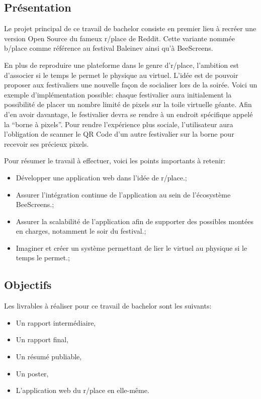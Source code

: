 \subsection{Présentation}

Le projet principal de ce travail de bachelor consiste en premier lieu à recréer une version Open Source du fameux r/place de Reddit. Cette variante nommée b/place comme référence au festival Baleinev ainsi qu'à BeeScreens.

En plus de reproduire une plateforme dans le genre d'r/place, l'ambition est d'associer si le temps le permet le physique au virtuel. L'idée est de pouvoir proposer aux festivaliers une nouvelle façon de socialiser lors de la soirée. Voici un exemple d'implémentation possible: chaque festivalier aura initialement la possibilité de placer un nombre limité de pixels sur la toile virtuelle géante. Afin d'en avoir davantage, le festivalier devra se rendre à un endroit spécifique appelé la “borne à pixels”. Pour rendre l'expérience plus sociale, l'utilisateur aura l'obligation de scanner le QR Code d'un autre festivalier sur la borne pour recevoir ses précieux pixels.

Pour résumer le travail à effectuer, voici les points importants à retenir:

\begin{itemize}
  \item Développer une application web dans l'idée de r/place.;
  \item Assurer l'intégration continue de l'application au sein de l'écosystème BeeScreens.;
  \item Assurer la scalabilité de l'application afin de supporter des possibles montées en charges, notamment le soir du festival.;
  \item Imaginer et créer un système permettant de lier le virtuel au physique si le temps le permet.;
\end{itemize}

\subsection{Objectifs}

Les livrables à réaliser pour ce travail de bachelor sont les suivants:

\begin{itemize}
  \item Un rapport intermédiaire,
  \item Un rapport final,
  \item Un résumé publiable,
  \item Un poster,
  \item L'application web du r/place en elle-même.
\end{itemize}

